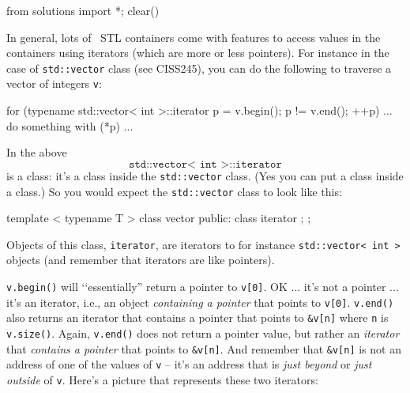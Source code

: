 \begin{python0}
from solutions import *; clear()
\end{python0}

In general, lots of \cpp\ STL containers come with
features to access values in the containers using
iterators (which are more or less pointers).
For instance in the case of \verb!std::vector! class (see CISS245),
you can do the following to traverse a vector of integers \verb!v!:
\begin{console}[fontsize=\footnotesize]
for (typename std::vector< int >::iterator p = v.begin();
     p != v.end(); ++p)
{
     ... do something with (*p) ...
}
\end{console}
In the above
\[
\texttt{std::vector< int >::iterator}
\]
is a class:
it's a class inside the \verb!std::vector! class.
(Yes you can put a class inside a class.)
So you would expect the \verb!std::vector! class to look like this:
\begin{console}[frame=single,fontsize=\footnotesize]
template < typename T >
class vector
{
public:
    class iterator
    {
    };
};
\end{console}
Objects of this class, \verb!iterator!, are iterators to
for instance \verb!std::vector< int >! objects
(and
remember that iterators are like pointers).

\verb!v.begin()! will \lq\lq essentially''
return a pointer to \verb!v[0]!.
OK ... it's not a pointer ... it's an iterator, i.e.,
an object \textit{containing
a pointer} that points to \verb!v[0]!.
\verb!v.end()! also returns an iterator that contains
a pointer that points to \verb!&v[n]! where
\verb!n! is \verb!v.size()!.
Again, \verb!v.end()! does not return a pointer value,
but rather an \textit{iterator} that \textit{contains a pointer} that points to \verb!&v[n]!.
And remember that \verb!&v[n]! is not an address of one of the values of
\verb!v! -- it's an address that is \textit{just beyond} or
\textit{just outside} of \verb!v!.
Here's a picture that represents these two iterators:


